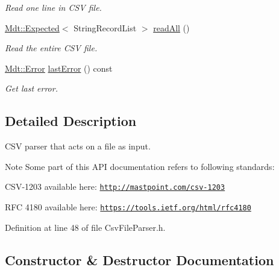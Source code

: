 \begin{DoxyCompactItemize}
\begin{DoxyCompactList}\small\item\em Read one line in C\+SV file. \end{DoxyCompactList}\item 
\hyperlink{class_mdt_1_1_expected}{Mdt\+::\+Expected}$<$ String\+Record\+List $>$ \hyperlink{class_mdt_1_1_plain_text_1_1_csv_file_parser_a205ee7b5fb424e48652ffeb722f2f9cb}{read\+All} ()
\begin{DoxyCompactList}\small\item\em Read the entire C\+SV file. \end{DoxyCompactList}\item 
\hyperlink{class_mdt_1_1_error}{Mdt\+::\+Error} \hyperlink{class_mdt_1_1_plain_text_1_1_csv_file_parser_a7c9d6b5675ee9d5b84d99197264ebffb}{last\+Error} () const 
\begin{DoxyCompactList}\small\item\em Get last error. \end{DoxyCompactList}\end{DoxyCompactItemize}


\subsection{Detailed Description}
C\+SV parser that acts on a file as input. 

\begin{DoxyNote}{Note}
Some part of this A\+PI documentation refers to following standards\+: \begin{DoxyItemize}
\item C\+S\+V-\/1203 available here\+: \href{http://mastpoint.com/csv-1203}{\tt http\+://mastpoint.\+com/csv-\/1203} \item R\+FC 4180 available here\+: \href{https://tools.ietf.org/html/rfc4180}{\tt https\+://tools.\+ietf.\+org/html/rfc4180} \end{DoxyItemize}

\end{DoxyNote}


Definition at line 48 of file Csv\+File\+Parser.\+h.



\subsection{Constructor \& Destructor Documentation}
